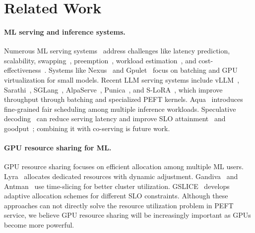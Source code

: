 \section{Related Work}
\label{sec:related}

\paragraph{ML serving and inference systems.} Numerous ML serving systems~\cite{258862,gunasekaran2022cocktail,lee2018pretzel,romero2021infaas,crankshaw2017clipper} address challenges like latency prediction, scalability, swapping~\cite{bai2020pipeswitch}, preemption~\cite{choi2020prema}, workload estimation~\cite{285173}, and cost-effectiveness~\cite{zhang2019mark}. Systems like Nexus~\cite{shen2019nexus} and Gpulet~\cite{choi2022serving} focus on batching and GPU virtualization for small models. 
Recent LLM serving systems include vLLM~\cite{10.1145/3600006.3613165}, Sarathi~\cite{agrawal2023sarathi}, SGLang~\cite{sglang}, AlpaServe~\cite{li2023alpaserve}, Punica~\cite{chen2023punica}, and S-LoRA~\cite{sheng2023s}, which improve throughput through batching and specialized PEFT kernels. Aqua~\cite{aqua2024} introduces fine-grained fair scheduling among multiple inference workloads.
Speculative decoding~\cite{specsampling, miao2023specinfer, suffixdecoding} can reduce serving latency and improve SLO attainment~\cite{adaserve} and goodput~\cite{turbospec}; combining it with co-serving is future work.

\paragraph{GPU resource sharing for ML.} GPU resource sharing focuses on efficient allocation among multiple ML users. Lyra~\cite{li2023lyra} allocates dedicated resources with dynamic adjustment. Gandiva~\cite{xiao2018gandiva} and Antman~\cite{xiao2020antman} use time-slicing for better cluster utilization. GSLICE~\cite{dhakal2020gslice} develops adaptive allocation schemes for different SLO constraints. Although these approaches can not directly solve the resource utilization problem in PEFT service, we believe GPU resource sharing will be increasingly important as GPUs become more powerful.